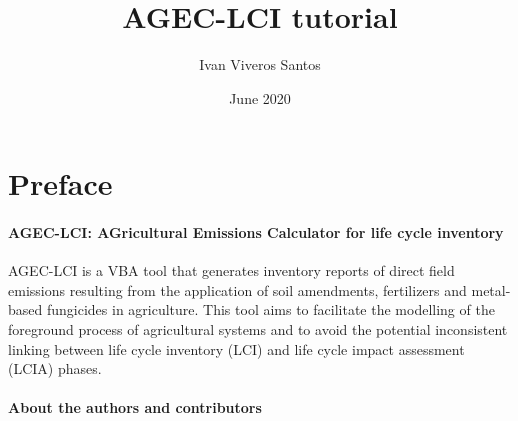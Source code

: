 \documentclass[openany]{book}
\title{AGEC-LCI tutorial}
\author{Ivan Viveros Santos}
\date{June 2020}
\begin{document}
\maketitle

{
\setcounter{tocdepth}{1}
\tableofcontents
}
\hypertarget{preface}{%
\chapter*{Preface}\label{preface}}

\hypertarget{agec-lci-agricultural-emissions-calculator-for-life-cycle-inventory}{%
\subsubsection*{AGEC-LCI: AGricultural Emissions Calculator for life cycle inventory}\label{agec-lci-agricultural-emissions-calculator-for-life-cycle-inventory}}

AGEC-LCI is a VBA tool that generates inventory reports of direct field emissions resulting from the application of soil amendments, fertilizers and metal-based fungicides in agriculture. This tool aims to facilitate the modelling of the foreground process of agricultural systems and to avoid the potential inconsistent linking between life cycle inventory (LCI) and life cycle impact assessment (LCIA) phases.

\hypertarget{about-the-authors-and-contributors}{%
\subsubsection*{About the authors and contributors}\label{about-the-authors-and-contributors}}
\end{document}
